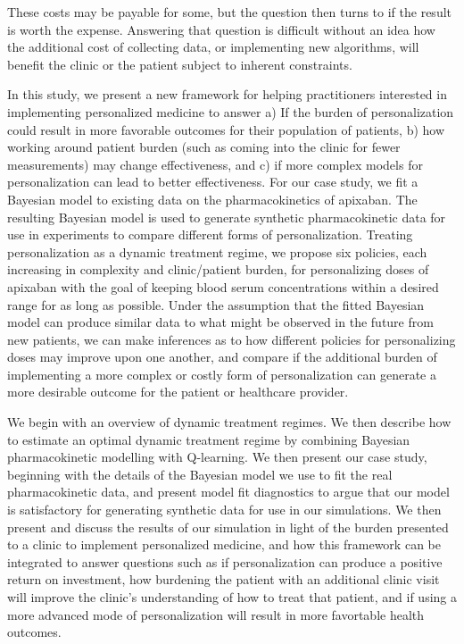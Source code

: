 These costs may be payable for some, but the question then turns to if the result is worth the expense.  Answering that question is difficult without an idea how the additional cost of collecting data, or implementing new algorithms, will benefit the clinic or the patient subject to inherent constraints. 

 In this study, we present a new framework for helping practitioners interested in implementing personalized medicine to answer a) If the burden of personalization could result in more favorable outcomes for their population of patients, b) how working around patient burden (such as coming into the clinic for fewer measurements) may change effectiveness, and c) if more complex models for personalization can lead to better effectiveness. For our case study, we fit a Bayesian model to existing data on the pharmacokinetics of apixaban.  The resulting Bayesian model is used to generate synthetic pharmacokinetic data for use in experiments to compare different forms of personalization. Treating personalization as a dynamic treatment regime, we propose six policies, each increasing in complexity and clinic/patient burden, for personalizing doses of apixaban with the goal of keeping blood serum concentrations within a desired range for as long as possible. Under the assumption that the fitted Bayesian model can produce similar data to what might be observed in the future from new patients, we can make inferences as to how different policies for personalizing doses may improve upon one another, and compare if the additional burden of implementing a more complex or costly form of personalization can generate a more desirable outcome for the patient or healthcare provider.  

We begin with an overview of dynamic treatment regimes.  We then describe how to estimate an optimal dynamic treatment regime  by combining Bayesian pharmacokinetic modelling with Q-learning.  We then present our case study, beginning with the details of the Bayesian model we use to fit the real pharmacokinetic data, and present model fit diagnostics to argue that our model is satisfactory for generating synthetic data for use in our simulations. We then present and discuss the results of our simulation in light of the burden presented to a clinic to implement personalized medicine, and how this framework can be integrated to answer questions such as if personalization can produce a positive return on investment, how burdening the patient with an additional clinic visit will improve the clinic's understanding of how to treat that patient, and if using a more advanced mode of personalization will result in more favortable health outcomes.
